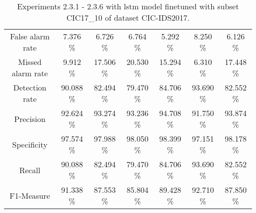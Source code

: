\begin{table}[htb]
\begin{tabular}{@{}ccccccc@{}}
        False alarm rate &  7.376 \% &  6.726 \% &  6.764 \% &  5.292 \% &  8.250 \% &  6.126 \% \\
        Missed alarm rate &  9.912 \% &  17.506 \% &  20.530 \% &  15.294 \% &  6.310 \% &  17.448 \% \\
        Detection rate &  90.088 \% &  82.494 \% &  79.470 \% &  84.706 \% &  93.690 \% &  82.552 \% \\
        Precision &  92.624 \% &  93.274 \% &  93.236 \% &  94.708 \% &  91.750 \% &  93.874 \% \\
        Specificity &  97.574 \% &  97.988 \% &  98.050 \% &  98.399 \% &  97.151 \% &  98.178 \% \\
        Recall &  90.088 \% &  82.494 \% &  79.470 \% &  84.706 \% &  93.690 \% &  82.552 \% \\
        F1-Measure &  91.338 \% &  87.553 \% &  85.804 \% &  89.428 \% &  92.710 \% &  87.850 \% \\
        \bottomrule
    \end{tabular}
    \caption{Experiments 2.3.1 - 2.3.6 with \gls{lstm} model finetuned with subset CIC17\_10 of dataset CIC-IDS2017.}
    \label{table:results:lstm:flows_subset}
\end{table}